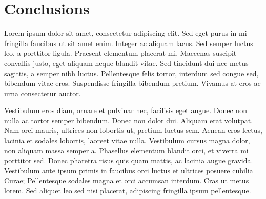 
\section{Conclusions}
\label{sec:conclusions}

Lorem ipsum dolor sit amet, consectetur adipiscing elit. Sed eget purus in mi fringilla faucibus ut sit amet enim. Integer ac aliquam lacus. Sed semper luctus leo, a porttitor ligula. Praesent elementum placerat mi. Maecenas suscipit convallis justo, eget aliquam neque blandit vitae. Sed tincidunt dui nec metus sagittis, a semper nibh luctus. Pellentesque felis tortor, interdum sed congue sed, bibendum vitae eros. Suspendisse fringilla bibendum pretium. Vivamus at eros ac urna consectetur auctor.

Vestibulum eros diam, ornare et pulvinar nec, facilisis eget augue. Donec non nulla ac tortor semper bibendum. Donec non dolor dui. Aliquam erat volutpat. Nam orci mauris, ultrices non lobortis ut, pretium luctus sem. Aenean eros lectus, lacinia et sodales lobortis, laoreet vitae nulla. Vestibulum cursus magna dolor, non aliquam massa semper a. Phasellus elementum blandit orci, et viverra mi porttitor sed. Donec pharetra risus quis quam mattis, ac lacinia augue gravida. Vestibulum ante ipsum primis in faucibus orci luctus et ultrices posuere cubilia Curae; Pellentesque sodales magna et orci accumsan interdum. Cras ut metus lorem. Sed aliquet leo sed nisi placerat, adipiscing fringilla ipsum pellentesque.

